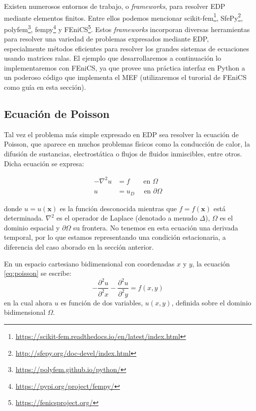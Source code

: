Existen numerosos entornos de trabajo, o \textit{frameworks}, para resolver EDP mediante elementos finitos. Entre ellos podemos mencionar scikit-fem\footnote{\href{https://scikit-fem.readthedocs.io/en/latest/index.html}{https://scikit-fem.readthedocs.io/en/latest/index.html}}, SfePy\footnote{\href{http://sfepy.org/doc-devel/index.html}{http://sfepy.org/doc-devel/index.html}}, polyfem\footnote{\href{https://polyfem.github.io/python/}{https://polyfem.github.io/python/}}, fempy\footnote{\href{https://pypi.org/project/fempy/}{https://pypi.org/project/fempy/}} y FEniCS\footnote{\href{https://fenicsproject.org/}{https://fenicsproject.org/}}. Estos \textit{frameworks} incorporan diversas herramientas para resolver una variedad de problemas expresados mediante EDP, especialmente métodos eficientes para resolver los grandes sistemas de ecuaciones usando matrices ralas. El ejemplo que desarrollaremos a continuación lo implementaremos con FEniCS, ya que provee una práctica interfaz en Python a un poderoso código que implementa el MEF (utilizaremos el turorial de FEniCS\cite{LangtangenLogg2017} como guía en esta sección).

\subsection{Ecuación de Poisson}

Tal vez el problema más simple expresado en EDP sea resolver la ecuación de Poisson, que aparece en muchos problemas físicos como la conducción de calor, la difusión de sustancias, electrostática o flujos de fluidos inmiscibles, entre otros. Dicha ecuación se expresa:

\begin{align} 
 -\nabla^2 u &= f\phantom{_D} \quad \text{ en } \Omega \label{eq:poisson} \\
           u &= u_D           \quad \text{ en } \partial \Omega \label{eq:poisson-b}
\end{align}

donde $u = u(\bm{x})$ es la función desconocida mientras que $f = f(\bm{x})$ está determinada. $\nabla^2$ es el operador de Laplace (denotado a menudo $\Delta$), $\Omega$ es el dominio espacial y $\partial \Omega$ su frontera. No tenemos en esta ecuación una derivada temporal, por lo que estamos representando una condición estacionaria, a diferencia del caso aborado en la sección anterior.

En un espacio cartesiano bidimensional con coordenadas $x$ y $y$, la ecuación \eqref{eq:poisson} se escribe:
\begin{equation}\label{eq:poisson2d}
 -\frac{\partial^2 u}{\partial^2 x} -\frac{\partial^2 u}{\partial^2 y} = f(x,y)
\end{equation} 
en la cual ahora $u$ es función de dos variables, $u(x,y)$, definida sobre el dominio bidimensional $\Omega$.

